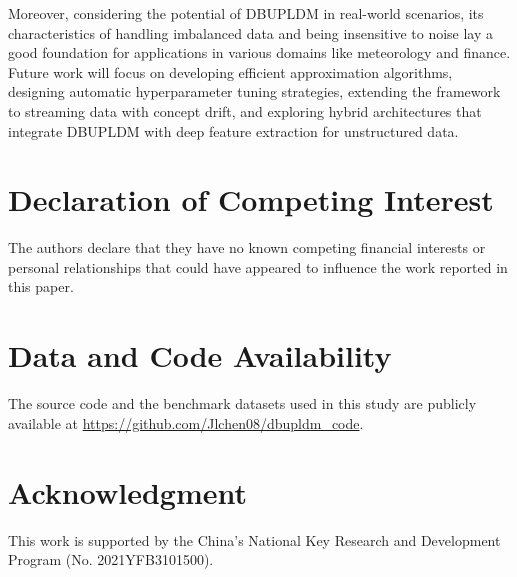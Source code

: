 \documentclass[a4paper]{cas-sc}
\begin{document}
{\color{blue}Moreover, considering the potential of DBUPLDM in real-world scenarios, its characteristics of handling imbalanced data and being insensitive to noise lay a good foundation for applications in various domains like meteorology and finance. {\color{magenta}Future work will focus on developing efficient approximation algorithms, designing automatic hyperparameter tuning strategies, extending the framework to streaming data with concept drift, and exploring hybrid architectures that integrate DBUPLDM with deep feature extraction for unstructured data.}}

\printcredits

\section*{Declaration of Competing Interest}
The authors declare that they have no known competing financial interests or personal relationships that could have appeared to influence the work reported in this paper.

{\color{red}\section*{Data and Code Availability}
The source code and the benchmark datasets used in this study are publicly available at \url{https://github.com/Jlchen08/dbupldm_code}.}

\section*{Acknowledgment}
This work is supported by the China's National Key Research and Development Program (No. 2021YFB3101500).

 




\end{document}
